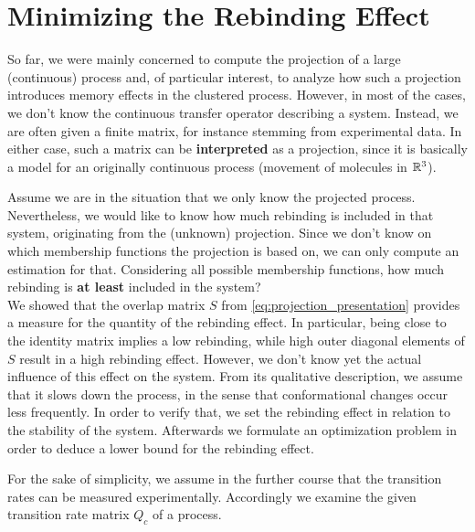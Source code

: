 \section{Minimizing the Rebinding Effect}
\label{sec:minimizing}

So far, we were mainly concerned to compute the projection of a large (continuous) process and, of particular interest, to analyze how such a projection introduces memory effects in the clustered process.
However, in most of the cases, we don't know the continuous transfer operator describing a system. Instead, we are often given a finite matrix, for instance stemming from experimental data. %
In either case, such a matrix can be \textbf{interpreted} as a projection, since it is basically a model for an originally continuous process (movement of molecules in $\mathbb{R}^3$).

Assume we are in the situation that we only know the projected process. Nevertheless, we would like to know how much rebinding is included in that system, originating from the (unknown) projection.
Since we don't know on which membership functions the projection is based on, we can only compute an estimation for that. Considering all possible membership functions, how much rebinding is \textbf{at least} included in the system?
\\

We showed that the overlap matrix $S$ from \eqref{eq:projection_presentation} provides a measure for the quantity of the rebinding effect. In particular, being close to the identity matrix implies a low rebinding, while high outer diagonal elements of $S$ result in a high rebinding effect.
However, we don't know yet the actual influence of this effect on the system.
From its qualitative description, we assume that it slows down the process, in the sense that conformational changes occur less frequently.
In order to verify that, we set the rebinding effect in relation to the stability of the system.
Afterwards we formulate an optimization problem in order to deduce a lower bound for the rebinding effect.

For the sake of simplicity, we assume in the further course that the transition rates can be measured experimentally.
Accordingly we examine the given transition rate matrix $Q_c$ of a process.


